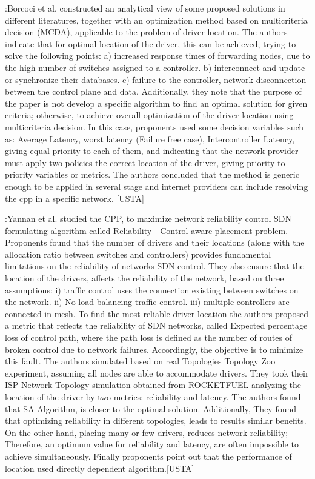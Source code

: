 \documentclass[a4paper,10pt]{article}
\begin{document}
\cite{VoBo15}:Borcoci et al. constructed an analytical view of some proposed solutions in different literatures, together with an optimization method based on multicriteria decision (MCDA), applicable to the problem of driver location. The authors indicate that for optimal location of the driver, this can be achieved, trying to solve the following points: a) increased response times of forwarding nodes, due to the high number of switches assigned to a controller. b) interconnect and update or synchronize their databases. c) failure to the controller, network disconnection between the control plane and data. Additionally, they note that the purpose of the paper is not develop a specific algorithm to find an optimal solution for given criteria; otherwise, to achieve overall optimization of the driver location using multicriteria decision. In this case, proponents used some decision variables such as: Average Latency, worst latency (Failure free case), Intercontroller Latency, giving equal priority to each of them, and indicating that the network provider must apply two policies the correct location of the driver, giving priority to priority variables or metrics. The authors concluded that the method is generic enough to be applied in several stage and internet providers can include resolving the cpp in a specific network. [USTA]


\cite{HuWa14}:Yannan et al. studied the CPP, to maximize network reliability control SDN formulating algorithm called Reliability - Control aware placement problem. Proponents found that the number of drivers and their locations (along with the allocation ratio between switches and controllers) provides fundamental limitations on the reliability of networks SDN control. They also ensure that the location of the drivers, affects the reliability of the network, based on three assumptions: i) traffic control uses the connection existing between switches on the network. ii) No load balancing traffic control. iii) multiple controllers are connected in mesh. To find the most reliable driver location the authors proposed a metric that reflects the reliability of SDN networks, called Expected percentage loss of control path, where the path loss is defined as the number of routes of broken control due to network failures. Accordingly, the objective is to minimize this fault. The authors simulated based on real Topologies Topology Zoo experiment, assuming all nodes are able to accommodate drivers. They took their ISP Network Topology simulation obtained from ROCKETFUEL analyzing the location of the driver by two metrics: reliability and latency. The authors found that SA Algorithm, is closer to the optimal solution. Additionally, They found that optimizing reliability in different topologies, leads to results similar benefits. On the other hand, placing many or few drivers, reduces network reliability; Therefore, an optimum value for reliability and latency, are often impossible to achieve simultaneously. Finally proponents point out that the performance of location used directly dependent algorithm.[USTA]
\end{document}
